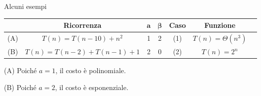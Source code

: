 \begin{frame}[shrink=6]{Alcuni esempi}

\bgroup
\def\arraystretch{1.1}
\begin{tabular}{|c|c|c|c|c|c|c|}
\hline
&\textbf{Ricorrenza} & $\mathbf{a}$ & $\mathbf{\beta}$ & \textbf{Caso} & \textbf{Funzione} \\
\hline
(A) & $T(n) = T(n-10)+n^2$ & 1 & 2 & (1) & $T(n) = \Theta(n^3)$ \\
\hline
(B) & $T(n) = T(n-2)+T(n-1)+1$ & 2 & 0 & (2) & $T(n) = 2^n$ \\
\hline
\end{tabular}
\egroup

\begin{mybox}
\BIL
\item[(A)] Poiché $a=1$, il costo è polinomiale.
\item[(B)] Poiché $a=2$, il costo è esponenziale.
\EIL
\end{mybox}

\end{frame}
